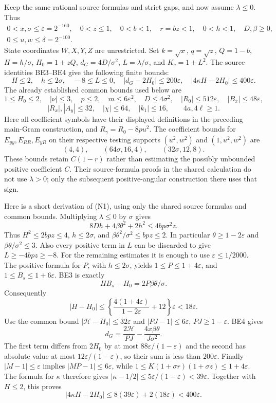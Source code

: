 \documentclass[11pt]{article}
\newcommand{\eps}{\varepsilon}
\begin{document}
Keep the same rational source formulas and strict gaps, and
now assume $\lambda\le0$. Thus
\[
 \begin{gathered}
 0<x,\sigma\le\eps=2^{-160},\quad 0<z\le1,\quad
 0<b<1,\quad r=bz<1,\quad 0<h<1,\quad D,\beta\ge0,
 \\ 0\le u,w\le\delta=2^{-100}.
 \end{gathered}
\]
State coordinates $W,X,Y,Z$ are unrestricted. Set $k=\sqrt x$,
$q=\sqrt z$, $Q=1-b$, $H=h/\sigma$, $H_0=1+zQ$,
$d_G=4D/\sigma^2$, $L=\lambda/\sigma$, and $K_c=1+L^2$.
The source identities BE3--BE4 give the following finite bounds:
\[
 H\le2,\quad h\le2\sigma,\quad -8\le L\le0,\quad
 |d_G-2H_0|\le200\eps,\quad
 |4\kappa H-2H_0|\le400\eps.                 \tag{N1}
\]
The already established common bounds used below are
\[
 1\le H_0\le2,\quad |\nu|\le3,\quad p\le2,\quad
 m\le6\eps^2,\quad D\le4\sigma^2,\quad
 |R_0|\le512\eps,\quad |B_x|\le48\eps,
\]
\[
 |R_x|,|A_y|\le32,\quad |\chi|\le64,\quad
 |k_1|\le16,\qquad 4a,4\ell\ge1.           \tag{N2}
\]
Here all coefficient symbols have their displayed definitions in the
preceding main-Gram construction, and $R_\gamma=R_0-8pu^2$.
The coefficient bounds for $E_{yy},E_{RR},E_{yR}$ on their respective
testing supports $(u^2,w^2)$ and $(1,u^2,w^2)$ are
\[
 (4,4),\qquad (64\sigma,16,4),\qquad
 (32\sigma,12,8).                         \tag{N3}
\]
These bounds retain $C(1-r)$ rather than estimating the possibly
unbounded positive coefficient $C$. Their source-formula proofs in the
shared calculation do not use $\lambda>0$; only the subsequent
positive-angular construction there uses that sign.

Here is a short derivation of (N1), using only the shared source
formulas and common bounds. Multiplying $\lambda\le0$ by $\sigma$
gives
\[
 8Dh+4\beta\theta^2+2h^2\le4bp\sigma^2z.
\]
Thus $H^2\le2bpz\le4$, $h\le2\sigma$, and
$\beta\theta^2/\sigma^2\le bpz\le2$. In particular
$\theta\ge1-2\eps$ and $\beta\theta/\sigma^2\le3$.
Also every positive term in $L$ can be discarded to give
$L\ge-4bpz\ge-8$.
For the remaining estimates it is enough to use $\eps\le1/2000$.
The positive formula for $P$, with $h\le2\sigma$, yields
$1\le P\le1+4\eps$, and $1\le B_s\le1+6\eps$.
BE3 is exactly
\[
 HB_s-H_0=2P\beta\theta/\sigma.
\]
Consequently
\[
 |H-H_0|\le
 \left\{\frac{4(1+4\eps)}{1-2\eps}+12\right\}\eps
 <18\eps.
\]
Use the common bound $|\mathcal H-H_0|\le32\eps$ and
$|PJ-1|\le6\eps$, $PJ\ge1-\eps$. BE4 gives
\[
 d_G=\frac{2\mathcal H}{PJ}
             -\frac{4x\beta\theta}{J\sigma^2}.
\]
The first term differs from $2H_0$ by at most
$88\eps/(1-\eps)$ and the second has absolute value at most
$12\eps/(1-\eps)$, so their sum is less than $200\eps$.
Finally $|M-1|\le\eps$ implies $|MP-1|\le6\eps$, while
$1\le K(1+\sigma r)(1+\sigma z)\le1+4\eps$.
The formula for $\kappa$ therefore gives
$|\kappa-1/2|\le5\eps/(1-\eps)<39\eps$.
Together with $H\le2$, this proves
\[
 |4\kappa H-2H_0|
 \le8(39\eps)+2(18\eps)<400\eps.
\]
\end{document}
